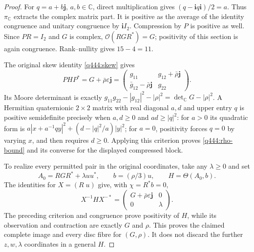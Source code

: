 \begin{proof}
For $q=a+b\mathbf j$, $a,b\in\mathbb C$, direct multiplication gives
$(q-\mathbf i q\mathbf i)/2=a$.
Thus $\pi_{\mathbb C}$ extracts the complex matrix part. It is positive
as the average of the identity congruence and unitary congruence by
$\mathbf iI_2$. Compression by $P$ is positive as well. Since $PR=I_2$
and $G$ is complex, $\mathscr O(RGR^*)=G$; positivity of this section is
again congruence. Rank--nullity gives $15-4=11$.

The original skew identity \eqref{q444:skew} gives
\[
 PHP^*=G+\bar\rho\varepsilon\mathbf j
 =\begin{pmatrix}
 g_{11}&g_{12}+\bar\rho\mathbf j\\
 \bar g_{12}-\bar\rho\mathbf j&g_{22}
 \end{pmatrix}.
\]
Its Moore determinant is exactly
$g_{11}g_{22}-|g_{12}|^2-|\rho|^2=\det_{\mathbb C}G-|\rho|^2$.
A Hermitian quaternionic $2\times2$ matrix with real diagonal $a,d$
and upper entry $q$ is positive semidefinite precisely when
$a,d\geq0$ and $ad\geq|q|^2$: for $a>0$ its quadratic form is
$a|x+a^{-1}qy|^2+(d-|q|^2/a)|y|^2$; for $a=0$, positivity forces
$q=0$ by varying $x$, and then requires $d\geq0$.
Applying this criterion proves \eqref{q444:rho-bound} and its converse
for the displayed compressed block.

To realize every permitted pair in the original coordinates, take any
$\lambda\geq0$ and set
\[
 A_0=RGR^*+\lambda uu^*,\qquad b=(\rho/3)u,
 \qquad H=\Theta(A_0,b).
\]
The identities for $X=(R\;u)$ give, with $\chi=R^*b=0$,
\[
 X^{-1}HX^{-*}
   =\begin{pmatrix}G+\bar\rho\varepsilon\mathbf j&0\\0&\lambda\end{pmatrix}.
\]
The preceding criterion and congruence prove positivity of $H$, while
its observation and contraction are exactly $G$ and $\rho$.
This proves the claimed complete image and every disc fibre for $(G,\rho)$.
It does not discard the further $z,w,\lambda$ coordinates in a general $H$.
\end{proof}


